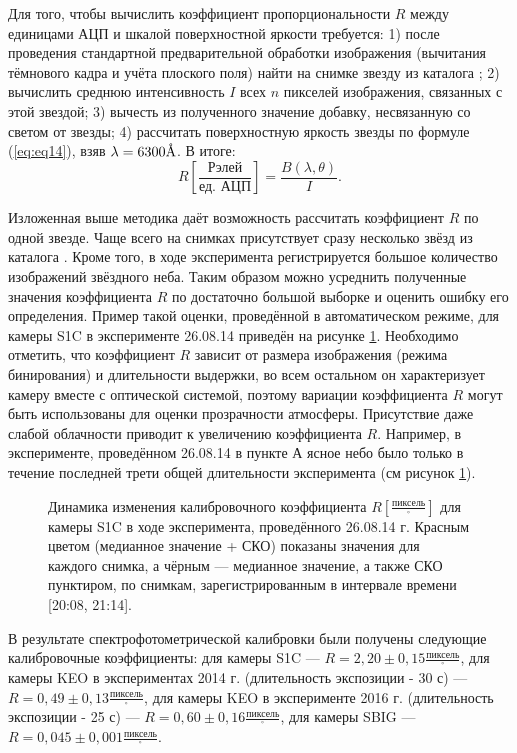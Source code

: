 \documentclass[12pt,a4paper]{article}
\newcommand{\angstrom}{\textup{\AA}}
\begin{document}
Для того, чтобы вычислить коэффициент пропорциональности $R$ между единицами АЦП и шкалой поверхностной яркости требуется: 1) после проведения стандартной предварительной обработки изображения (вычитания тёмнового кадра и учёта плоского поля) найти на снимке звезду из каталога \cite{Kharitonov1978}; 2) вычислить среднюю интенсивность $I$ всех $n$ пикселей изображения, связанных с этой звездой; 3) вычесть из полученного значение добавку, несвязанную со светом от звезды; 4) рассчитать поверхностную яркость звезды по формуле (\ref{eq:eq14}), взяв $\lambda = 6300\angstrom$. В итоге:
\begin{equation}\label{eq:eq15}
R [\frac{\text{Рэлей}}{\text{ед. АЦП}}]=\frac{B(\lambda,\theta)}{I}.
\end{equation}

Изложенная выше методика даёт возможность рассчитать коэффициент $R$ по одной звезде. Чаще всего на снимках присутствует сразу несколько звёзд из каталога \cite{Kharitonov1978}. Кроме того, в ходе эксперимента регистрируется большое количество изображений звёздного неба. Таким образом можно усреднить полученные значения коэффициента $R$ по достаточно большой выборке и оценить ошибку его определения. Пример такой оценки, проведённой в автоматическом режиме, для камеры S1C в эксперименте 26.08.14 приведён на рисунке \ref{fig:fig3}. Необходимо отметить, что коэффициент $R$ зависит от размера изображения (режима бинирования) и длительности выдержки, во всем остальном он характеризует камеру вместе с оптической системой, поэтому вариации коэффициента $R$ могут быть использованы для оценки прозрачности атмосферы. Присутствие даже слабой облачности приводит к увеличению коэффициента $R$. Например, в эксперименте, проведённом 26.08.14 в пункте А ясное небо было только в течение последней трети общей длительности эксперимента (см рисунок \ref{fig:fig3}).

\begin{figure}[h]
	\caption{Динамика изменения калибровочного коэффициента $R [\frac{\text{пиксель}}{^{\circ}}]$ для камеры S1C в ходе эксперимента, проведённого 26.08.14 г. Красным цветом (медианное значение + СКО) показаны значения для каждого снимка, а чёрным --- медианное значение, а также СКО пунктиром, по снимкам, зарегистрированным в интервале времени [20:08, 21:14].}
	\label{fig:fig3}
\end{figure}

В результате спектрофотометрической калибровки были получены следующие калибровочные коэффициенты: для камеры S1C --- $R = 2,20 \pm 0,15 \frac{\text{пиксель}}{^{\circ}}$, для камеры KEO в экспериментах 2014 г. (длительность экспозиции - 30 с) --- $R = 0,49 \pm 0,13 \frac{\text{пиксель}}{^{\circ}}$, для камеры KEO в эксперименте 2016 г. (длительность экспозиции - 25 с) --- $R = 0,60 \pm 0,16 \frac{\text{пиксель}}{^{\circ}}$, для камеры SBIG --- $R = 0,045 \pm 0,001\frac{\text{пиксель}}{^{\circ}}$.
\end{document}

